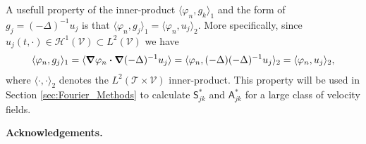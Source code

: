 \documentclass[leqno,onefignum,onetabnum]{siamltex1213}
\newcommand{\Tc}{\mathcal{T}}
\newcommand{\Vc}{\mathcal{V}}
\newcommand{\Sm}{\mathsf{S}}
\newcommand{\Am}{\mathsf{A}}
\newcommand{\Hs}{\mathscr{H}}
\newcommand\bnabla{\mbox{\boldmath${\nabla}$}}
\providecommand\bcdot{\boldsymbol{\cdot}}
\begin{document}
A usefull property of the inner-product $\langle\varphi_n,g_k\rangle_1$ and the form of
$g_j=(-\Delta)^{-1}u_j$ is that $\langle\varphi_n,g_j\rangle_1=\langle\varphi_n,u_j\rangle_2$. More
specifically, since $u_j(t,\cdot)\in\Hs^1(\Vc)\subset L^2(\Vc)$ we have
\cite{Stakgold:BVP:2000}  
%
\begin{align}\label{eq:H1_to_L2}
  \langle\varphi_n,g_j\rangle_1=\langle\bnabla \varphi_n\bcdot\bnabla (-\Delta)^{-1}u_j\rangle
         =\langle\varphi_n,(-\Delta)(-\Delta)^{-1}u_j\rangle_2
         =\langle\varphi_n,u_j\rangle_2,
\end{align}
%
where $\langle\cdot,\cdot\rangle_2$ denotes the $L^2(\Tc\times\Vc)$ inner-product. This
property will be used in Section \ref{sec:Fourier_Methods} to
calculate $\Sm^*_{jk}$ and $\Am^*_{jk}$ for a large class of velocity
fields.   







\medskip

{\bf Acknowledgements.}


\medskip









\end{document}
